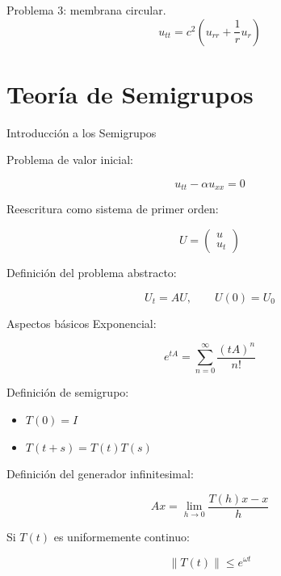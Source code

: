 \documentclass[11pt]{beamer}
\begin{document}
	\begin{frame}
		Problema 3: membrana circular.
		\[
		u_{tt}=c^2\left(u_{rr}+\frac{1}{r}u_r\right)
		\]
	\end{frame}
	
	\begin{frame}
	\end{frame}
	
	\section{Teoría de Semigrupos}
	
	\begin{frame}
		\centerline{\huge Introducción a los Semigrupos}
	\end{frame}
	
	\begin{frame}
		Problema de valor inicial:
		
		\[
		u_{tt}-\alpha u_{xx}=0
		\]
		
		Reescritura como sistema de primer orden:
		
		\[
		U=\begin{pmatrix}u\\u_t\end{pmatrix}
		\]
	\end{frame}
	
	\begin{frame}
		Definición del problema abstracto:
		
		\[
		U_t = AU,\qquad U(0)=U_0
		\]
	\end{frame}
	
	\begin{frame}{Aspectos básicos}
		Exponencial:
		
		\[
		e^{tA}=\sum_{n=0}^\infty \frac{(tA)^n}{n!}
		\]
	\end{frame}
	
	\begin{frame}
		Definición de semigrupo:
		
		\begin{itemize}
			\item $T(0)=I$
			\item $T(t+s)=T(t)T(s)$
		\end{itemize}
	\end{frame}
	
	\begin{frame}
		Definición del generador infinitesimal:
		
		\[
		A x = \lim_{h\to 0} \frac{T(h)x - x}{h}
		\]
	\end{frame}
	
	\begin{frame}
		Si $T(t)$ es uniformemente continuo:
		
		\[
		\|T(t)\|\le e^{\omega t}
		\]
	\end{frame}
	
\end{document}
